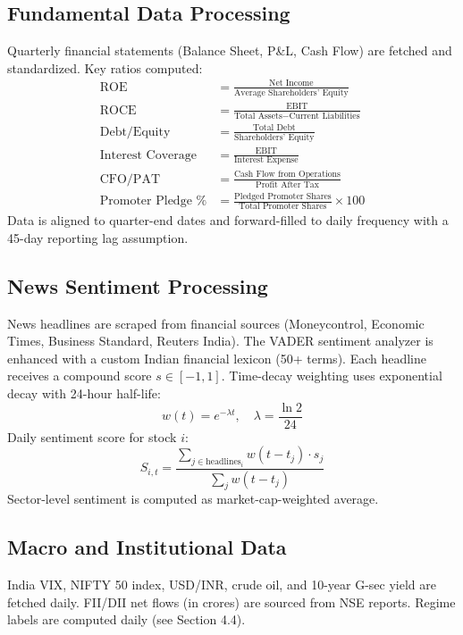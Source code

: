 \documentclass[12pt,a4paper]{report}
\begin{document}
\subsection{Fundamental Data Processing}
Quarterly financial statements (Balance Sheet, P\&L, Cash Flow) are fetched and standardized. Key ratios computed:
\begin{align}
    \text{ROE} &= \frac{\text{Net Income}}{\text{Average Shareholders' Equity}} \\
    \text{ROCE} &= \frac{\text{EBIT}}{\text{Total Assets} - \text{Current Liabilities}} \\
    \text{Debt/Equity} &= \frac{\text{Total Debt}}{\text{Shareholders' Equity}} \\
    \text{Interest Coverage} &= \frac{\text{EBIT}}{\text{Interest Expense}} \\
    \text{CFO/PAT} &= \frac{\text{Cash Flow from Operations}}{\text{Profit After Tax}} \\
    \text{Promoter Pledge \%} &= \frac{\text{Pledged Promoter Shares}}{\text{Total Promoter Shares}} \times 100
\end{align}
Data is aligned to quarter-end dates and forward-filled to daily frequency with a 45-day reporting lag assumption.

\subsection{News Sentiment Processing}
News headlines are scraped from financial sources (Moneycontrol, Economic Times, Business Standard, Reuters India). The VADER sentiment analyzer \cite{hutto2014vader} is enhanced with a custom Indian financial lexicon (50+ terms). Each headline receives a compound score $s \in [-1, 1]$. Time-decay weighting uses exponential decay with 24-hour half-life:
\begin{equation}
    w(t) = e^{-\lambda t}, \quad \lambda = \frac{\ln 2}{24}
\end{equation}
Daily sentiment score for stock $i$:
\begin{equation}
    S_{i,t} = \frac{\sum_{j \in \text{headlines}_i} w(t - t_j) \cdot s_j}{\sum_{j} w(t - t_j)}
\end{equation}
Sector-level sentiment is computed as market-cap-weighted average.

\subsection{Macro and Institutional Data}
India VIX, NIFTY 50 index, USD/INR, crude oil, and 10-year G-sec yield are fetched daily. FII/DII net flows (in \textcurrency crores) are sourced from NSE reports. Regime labels are computed daily (see Section 4.4).
\end{document}

